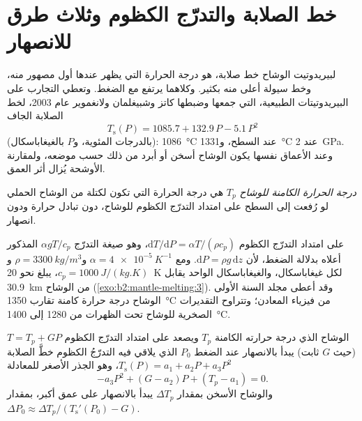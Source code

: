 \section{خط الصلابة والتدرّج الكظوم وثلاث طرق للانصهار}\label{sec:b2:mantle-melting:solidus}

لبيريدوتيت الوشاح خط صلابة، هو درجة الحرارة التي يظهر عندها أول مصهور منه،
وخط سيولة أعلى منه بكثير. وكلاهما يرتفع مع الضغط. وتعطي التجارب على
البيريدوتيتات الطبيعية، التي جمعها وضبطها كاتز وشبيغلمان ولانغموير عام 2003،
لخط الصلابة الجاف
\[
  T_{\mathrm{s}}(P) = 1085.7 + 132.9\,P - 5.1\,P^2
\]
(بالدرجات المئوية، و$P$ بالغيغاباسكال): \qty{1086}{\celsius} عند السطح،
و\qty{1331}{\celsius} عند \qty{2}{GPa}. وعند الأعماق نفسها يكون الوشاح أسخن أو
أبرد من ذلك حسب موضعه، ولمقارنة الأوشحة يُزال
أثر العمق.

\begin{definition}\label{def:b2:mantle-melting:tp}
\emph{درجة الحرارة الكامنة للوشاح} $T_p$
هي درجة الحرارة التي تكون لكتلة من الوشاح الحملي لو
رُفعت إلى السطح على امتداد التدرّج الكظوم للوشاح، دون تبادل حرارة
ودون انصهار.
\end{definition}

على امتداد التدرّج الكظوم $\mathrm dT/\mathrm dP = \alpha T/(\rho c_p)$، وهو صيغة
التدرّج $\alpha gT/c_p$ المذكور أعلاه بدلالة الضغط، لأن $\mathrm dP = \rho
g\,\mathrm dz$. ومع $\alpha = \qty{4e-5}{K^{-1}}$ و$\rho = \qty{3300}{kg/m^3}$
و$c_p = \qty{1000}{J/(kg.K)}$، يبلغ نحو \qty{20}{K} لكل غيغاباسكال،
والغيغاباسكال الواحد يقابل \qty{30.9}{km} من الوشاح (\cref{exo:b2:mantle-melting:3}). وقد أعطى مجلد السنة الأولى
الوشاح درجة حرارة كامنة تقارب \qty{1350}{\celsius} من فيزياء
المعادن؛ وتتراوح التقديرات الصخرية للوشاح تحت الظهرات من 1280 إلى
\qty{1400}{\celsius}.

\begin{proposition}\label{prop:b2:mantle-melting:onset}
الوشاح الذي درجة حرارته الكامنة $T_p$ ويصعد على امتداد التدرّج الكظوم $T = T_p + GP$ (حيث $G$
ثابت) يبدأ بالانصهار عند الضغط $P_0$ الذي يلاقي فيه التدرّجُ الكظوم
خطَّ الصلابة $T_{\mathrm s}(P) = a_1 + a_2P + a_3P^2$، وهو الجذر الأصغر للمعادلة
\[
  -a_3P^2 + (G - a_2)P + (T_p - a_1) = 0 .
\]
والوشاح الأسخن بمقدار $\Delta T_p$ يبدأ بالانصهار على عمق أكبر، بمقدار $\Delta P_0 \approx
\Delta T_p/(T_{\mathrm s}'(P_0) - G)$.
\end{proposition}

